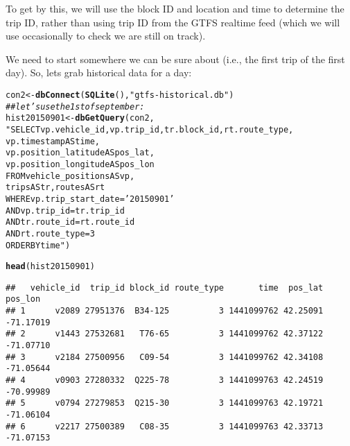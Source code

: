 \documentclass[10pt]{article}\usepackage[]{graphicx}\usepackage[]{color}
\makeatletter
\newcommand{\hlstr}[1]{\textcolor[rgb]{0.192,0.494,0.8}{#1}}%
\newcommand{\hlcom}[1]{\textcolor[rgb]{0.678,0.584,0.686}{\textit{#1}}}%
\newcommand{\hlstd}[1]{\textcolor[rgb]{0.345,0.345,0.345}{#1}}%
\newcommand{\hlkwb}[1]{\textcolor[rgb]{0.69,0.353,0.396}{#1}}%
\newcommand{\hlkwd}[1]{\textcolor[rgb]{0.737,0.353,0.396}{\textbf{#1}}}%
\newenvironment{kframe}{%
 \def\at@end@of@kframe{}%
 \ifinner\ifhmode%
  \def\at@end@of@kframe{\end{minipage}}%
  \begin{minipage}{\columnwidth}%
 \fi\fi%
 \def\FrameCommand##1{\hskip\@totalleftmargin \hskip-\fboxsep
 \colorbox{shadecolor}{##1}\hskip-\fboxsep
     \hskip-\linewidth \hskip-\@totalleftmargin \hskip\columnwidth}%
 \MakeFramed {\advance\hsize-\width
   \@totalleftmargin\z@ \linewidth\hsize
   \@setminipage}}%
 {\par\unskip\endMakeFramed%
 \at@end@of@kframe}
\newenvironment{knitrout}{}{} %
\makeatother
\begin{document}
To get by this, we will use the block ID and location and time to determine the trip ID,
rather than using trip ID from the GTFS realtime feed (which we will use occasionally to
check we are still on track).


We need to start somewhere we can be sure about (i.e., the first trip of the first day).
So, lets grab historical data for a day:
\begin{knitrout}
\color{fgcolor}\begin{kframe}
\begin{alltt}
\hlstd{con2} \hlkwb{<-} \hlkwd{dbConnect}\hlstd{(}\hlkwd{SQLite}\hlstd{(),} \hlstr{"gtfs-historical.db"}\hlstd{)}
\hlcom{## let's use the 1st of september:}
\hlstd{hist20150901} \hlkwb{<-} \hlkwd{dbGetQuery}\hlstd{(con2,}
                           \hlstr{"SELECT vp.vehicle_id, vp.trip_id, tr.block_id, rt.route_type, 
                                   vp.timestamp AS time, 
                                   vp.position_latitude AS pos_lat, 
                                   vp.position_longitude AS pos_lon 
                            FROM vehicle_positions AS vp, 
                                 trips AS tr, routes AS rt
                            WHERE vp.trip_start_date = '20150901'
                              AND vp.trip_id    = tr.trip_id 
                              AND tr.route_id   = rt.route_id 
                              AND rt.route_type = 3 
                            ORDER BY time"}\hlstd{)}

\hlkwd{head}\hlstd{(hist20150901)}
\end{alltt}
\begin{verbatim}
##   vehicle_id  trip_id block_id route_type       time  pos_lat   pos_lon
## 1      v2089 27951376  B34-125          3 1441099762 42.25091 -71.17019
## 2      v1443 27532681   T76-65          3 1441099762 42.37122 -71.07710
## 3      v2184 27500956   C09-54          3 1441099762 42.34108 -71.05644
## 4      v0903 27280332  Q225-78          3 1441099763 42.24519 -70.99989
## 5      v0794 27279853  Q215-30          3 1441099763 42.19721 -71.06104
## 6      v2217 27500389   C08-35          3 1441099763 42.33713 -71.07153
\end{verbatim}
\end{kframe}
\end{knitrout}
\end{document}
